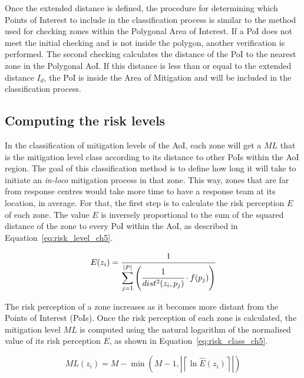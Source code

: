 \begin{refsection}
Once the extended distance is defined, the procedure for determining which Points of Interest to include in the classification process is similar to the method used for checking zones within the Polygonal Area of Interest. If a PoI does not meet the initial checking and is not inside the polygon, another verification is performed. The second checking calculates the distance of the PoI to the nearest zone in the Polygonal AoI. If this distance is less than or equal to the extended distance $I_d$, the PoI is inside the Area of Mitigation and will be included in the classification process.

\subsection{Computing the risk levels}


In the classification of mitigation levels of the AoI, each zone will get a $ML$ that is the mitigation level class according to its distance to other PoIs within the AoI region. The goal of this classification method is to define how long it will take to initiate an \emph{in-loco} mitigation process in that zone. This way, zones that are far from response centres would take more time to have a response team at its location, in average. For that, the first step is to calculate the risk perception $E$ of each zone. The value $E$ is inversely proportional to the sum of the squared distance of the zone to every PoI within the AoI, as described in Equation~\ref{eq:risk_level_ch5}.

\begin{equation}
  \label{eq:risk_level_ch5}
  E(z_i) = \cfrac{1}{\displaystyle\sum_{j = 1}^{\lvert P \rvert}\left(\cfrac{1}{dist^2(z_i, p_j)} \cdot f(p_j)\right)} 
\end{equation}

The risk perception of a zone increases as it becomes more distant from the Points of Interest (PoIs). Once the risk perception of each zone is calculated, the mitigation level $ML$ is computed using the natural logarithm of the normalised value of its risk perception $E$, as shown in Equation~\ref{eq:risk_class_ch5}.

\begin{equation}
  \label{eq:risk_class_ch5}
  ML(z_i) = M - \min\left(M - 1, \left| \left\lceil \ln{\widehat{E}(z_i)} \right\rceil \right| \right)
\end{equation}


\end{refsection}
